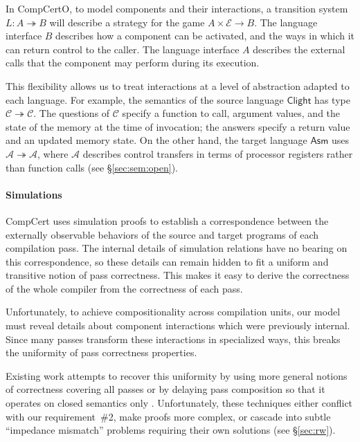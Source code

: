 \documentclass[sigplan,screen]{acmart}
\newcommand{\kw}[1]{\ensuremath{ \mathsf{#1} }}
\begin{document}
In CompCertO,
to model components and their interactions,
a transition system $L : A \twoheadrightarrow B$
will describe a strategy
for the game
$A \times \mathcal{E} \rightarrow B$.
The language interface $B$ describes how a component can be activated,
and the ways in which it can return control to the caller.
The language interface $A$ describes the external calls that the component
may perform during its execution.

This flexibility allows us to treat interactions
at a level of abstraction adapted to each language.
For example,
the semantics of
the source language \kw{Clight} has type
\mbox{$\mathcal{C} \twoheadrightarrow \mathcal{C}$}.
The questions of $\mathcal{C}$ specify a function to call,
argument values,
and the state of the memory at the time of invocation;
the answers specify a return value and an updated memory state.
On the other hand, the target language \kw{Asm} uses
$\mathcal{A} \twoheadrightarrow \mathcal{A}$,
where $\mathcal{A}$ describes control transfers
in terms of processor registers
rather than function calls (see \S\ref{sec:sem:open}).



\paragraph{Simulations} %

CompCert uses simulation proofs
to establish a correspondence between
the externally observable behaviors of
the source and target programs of each compilation pass.
The internal details of simulation relations
have no bearing on this correspondence,
so these details can remain hidden
to fit a uniform and transitive notion of pass correctness.
This makes it easy to derive the correctness
of the whole compiler
from the correctness of each pass.

Unfortunately,
to achieve compositionality across compilation units,
our model must reveal details
about component interactions
which were previously internal.
Since many passes transform
these interactions in
specialized ways,
this breaks the uniformity
of pass correctness properties.

Existing work attempts to recover this uniformity
by using more general notions of correctness
covering all passes
\cite{compcompcert,compcertm}
or by delaying pass composition so that
it operates on closed semantics only
\cite{sepcompcert,compcertm}.
Unfortunately, these techniques either
conflict with our requirement~\#2,
make proofs more complex,
or cascade into subtle ``impedance mismatch'' problems
requiring their own solutions
(see \S\ref{sec:rw}).
\end{document}
